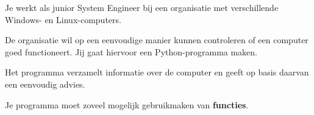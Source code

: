 Je werkt als junior System Engineer bij een organisatie met verschillende Windows- en Linux-computers.

De organisatie wil op een eenvoudige manier kunnen controleren of een computer goed functioneert. Jij gaat hiervoor een Python-programma maken.

Het programma verzamelt informatie over de computer en geeft op basis daarvan een eenvoudig advies.

Je programma moet zoveel mogelijk gebruikmaken van \textbf{functies}.


